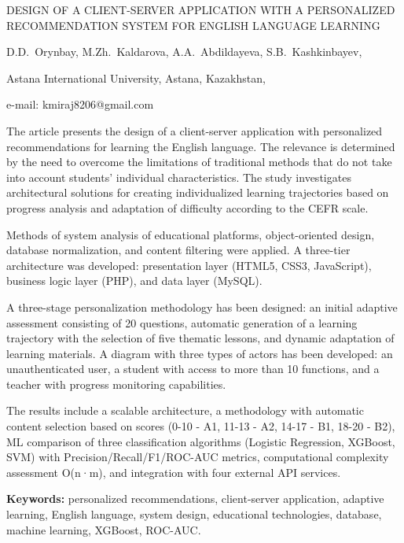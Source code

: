 \begin{header}
DESIGN OF A CLIENT-SERVER APPLICATION WITH A PERSONALIZED RECOMMENDATION SYSTEM FOR ENGLISH LANGUAGE LEARNING

D.D.~Orynbay,
M.Zh.~Kaldarova\envelope,
A.A.~Abdildayeva,
S.B.~Kashkinbayev,
\end{header}

\begin{affil}
Astana International University, Astana, Kazakhstan,

e-mail: kmiraj8206@gmail.com
\end{affil}

The article presents the design of a client-server application with
personalized recommendations for learning the English language. The
relevance is determined by the need to overcome the limitations of
traditional methods that do not take into account students' individual
characteristics. The study investigates architectural solutions for
creating individualized learning trajectories based on progress analysis
and adaptation of difficulty according to the CEFR scale.

Methods of system analysis of educational platforms, object-oriented
design, database normalization, and content filtering were applied. A
three-tier architecture was developed: presentation layer (HTML5, CSS3,
JavaScript), business logic layer (PHP), and data layer (MySQL).

A three-stage personalization methodology has been designed: an initial
adaptive assessment consisting of 20 questions, automatic generation of
a learning trajectory with the selection of five thematic lessons, and
dynamic adaptation of learning materials. A diagram with three types of
actors has been developed: an unauthenticated user, a student with
access to more than 10 functions, and a teacher with progress monitoring
capabilities.

The results include a scalable architecture, a methodology with
automatic content selection based on scores (0-10 - A1, 11-13 - A2,
14-17 - B1, 18-20 - B2), ML comparison of three classification
algorithms (Logistic Regression, XGBoost, SVM) with
Precision/Recall/F1/ROC-AUC metrics, computational co\-mplexity assessment
O(n·m), and integration with four external API services.

{\bfseries Keywords:} personalized recommendations, client-server
application, adaptive learning, English lang\-uage, system design,
educational technologies, database, machine learning, XGBoost, ROC-AUC.

